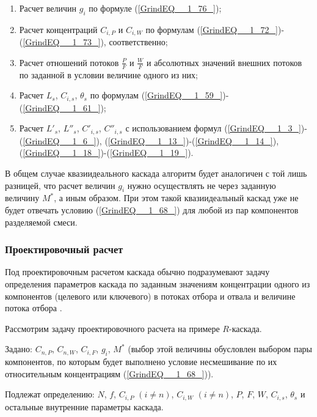 \begin{enumerate}
  \item Расчет величин $g_i$ по формуле (\ref{GrindEQ__1_76_});
  \item Расчет концентраций $C_{i,P}$ и $C_{i,W}$ по формулам (\ref{GrindEQ__1_72_})-(\ref{GrindEQ__1_73_}), соответственно;
  \item Расчет отношений потоков  $\frac{P}{F}$ и $\frac{W}{F}$ и абсолютных значений внешних потоков по заданной в условии величине одного из них; 
  \item Расчет $L_{s}$, $C_{i, s}$, $\theta_{s}$ по формулам (\ref{GrindEQ__1_59_})-(\ref{GrindEQ__1_61_});
  \item Расчет ${L'}_{s}$, ${L''}_{s}$, $C'_{i, s} $, $C''_{i, s}$ с использованием формул (\ref{GrindEQ__1_3_})-(\ref{GrindEQ__1_6_}), (\ref{GrindEQ__1_13_})-(\ref{GrindEQ__1_14_}), (\ref{GrindEQ__1_18_})-(\ref{GrindEQ__1_19_}).
\end{enumerate}

В общем случае квазиидеального каскада алгоритм будет аналогичен с той лишь разницей, что расчет величин $g_i$ нужно осуществлять не через заданную величину $M^{*}$, а иным образом. При этом такой квазиидеальный каскад уже не будет отвечать условию (\ref{GrindEQ__1_68_}) для любой из пар компонентов разделяемой смеси. 

\subsubsection{Проектировочный расчет}
Под проектировочным расчетом каскада обычно подразумевают задачу определения параметров каскада по заданным значениям концентрации одного из компонентов (целевого или ключевого) в потоках отбора и отвала и величине потока отбора \cite{sulaberidzeTeoriyaKaskadovDlya2011}.

Рассмотрим задачу проектировочного расчета на примере $R$-каскада. 

Задано: $C_{n,P}$, $C_{n,W}$, $C_{i,F}$, $g_i$, $M^{*}$ (выбор этой величины обусловлен выбором пары компонентов, по которым будет выполнено условие несмешивание по их относительным концентрациям (\ref{GrindEQ__1_68_})).

Подлежат определению: $N$, $f$, $C_{i,P}$ $(i\neq n)$, $C_{i,W}$ $(i\neq n)$, $P$, $F$, $W$, $C_{i, s}$, $\theta_{s}$ и остальные внутренние параметры каскада. 

